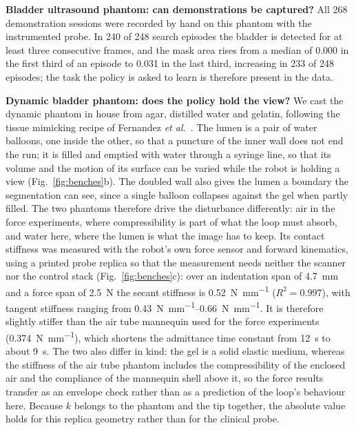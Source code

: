 \documentclass[conference]{IEEEtran}
\begin{document}
\textbf{Bladder ultrasound phantom: can demonstrations be captured?} All 268
demonstration sessions were recorded by hand on this phantom with the
instrumented probe. In 240 of 248 search episodes the bladder is detected for at
least three consecutive frames, and the mask area rises from a median of
\num{0.000} in the first third of an episode to \num{0.031} in the last third,
increasing in 233 of 248 episodes; the task the policy is asked to learn is
therefore present in the data.

\textbf{Dynamic bladder phantom: does the policy hold the view?} We cast the
dynamic phantom in house from agar, distilled water and gelatin, following the
tissue mimicking recipe of Fernandez \emph{et al.}~\cite{fernandez2024phantom}.
The lumen is a pair of water balloons, one inside the other, so that a
puncture of the inner wall does not end the run; it is filled and emptied with
water through a syringe line, so that its volume and the motion of its surface
can be varied while the robot is holding a view (Fig.~\ref{fig:benches}b). The
doubled wall also gives the lumen a boundary the segmentation can see, since a
single balloon collapses against the gel when partly filled. The two phantoms therefore drive the
disturbance differently: air in the force experiments, where compressibility is
part of what the loop must absorb, and water here, where the lumen is what the
image has to keep. Its contact stiffness was measured with the robot's
own force sensor and forward kinematics, using a printed probe replica so that
the measurement needs neither the scanner nor the control stack
(Fig.~\ref{fig:benches}c): over an indentation span of
\SI{4.7}{\milli\metre} and a force span of \SI{2.5}{\newton} the secant
stiffness is \SI{0.52}{\newton\per\milli\metre} ($R^2 = \num{0.997}$), with
tangent stiffness ranging from \SIrange{0.43}{0.66}{\newton\per\milli\metre}.
It is therefore slightly stiffer than the air tube mannequin used for the force
experiments (\SI{0.374}{\newton\per\milli\metre}), which shortens
the admittance time constant from \SI{12}{\second} to about \SI{9}{\second}.
The two also differ in kind: the gel is a solid elastic medium, whereas the
stiffness of the air tube phantom includes the compressibility of the enclosed
air and the compliance of the mannequin shell above it, so the force results transfer as an envelope check rather than as a
prediction of the loop's behaviour here.
Because $k$ belongs to the phantom and the tip together, the absolute value
holds for this replica geometry rather than for the clinical probe.
\end{document}
